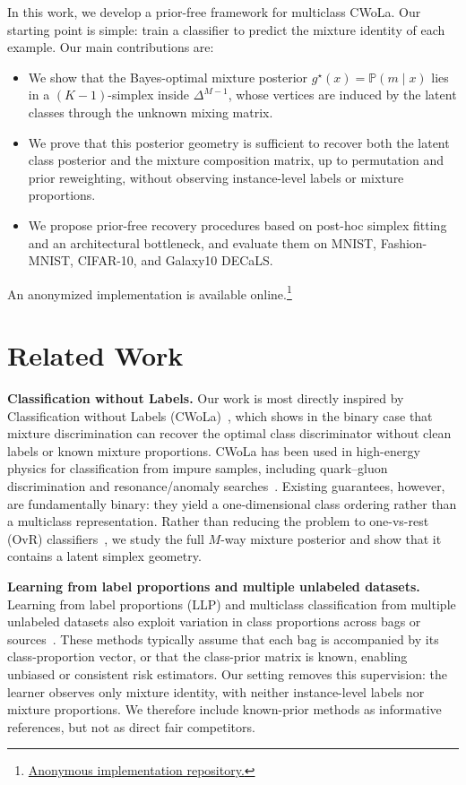 \documentclass{article}
\theoremstyle{plain}
\theoremstyle{definition}
\theoremstyle{remark}
\begin{document}
In this work, we develop a prior-free framework for multiclass CWoLa. 
Our starting point is simple: train a classifier to predict the mixture identity of each example. 
Our main contributions are:
\begin{itemize}
    \item We show that the Bayes-optimal mixture posterior \(g^\star(x)=\mathbb{P}(m\mid x)\) lies in a \((K-1)\)-simplex inside \(\Delta^{M-1}\), whose vertices are induced by the latent classes through the unknown mixing matrix.
    \item We prove that this posterior geometry is sufficient to recover both the latent class posterior and the mixture composition matrix, up to permutation and prior reweighting, without observing instance-level labels or mixture proportions.    
    \item We propose prior-free recovery procedures based on post-hoc simplex fitting and an architectural bottleneck, and evaluate them on MNIST, Fashion-MNIST, CIFAR-10, and Galaxy10 DECaLS.
\end{itemize}

An anonymized implementation is available online.\footnote{
\href{https://anonymous.4open.science/r/MulticlassClassificationWithoutLabelsViaPosteriorSimplexGeometry-B2CA}
{Anonymous implementation repository.}
}

\section{Related Work}

\textbf{Classification without Labels.}
Our work is most directly inspired by Classification without Labels (CWoLa)~\citep{Metodiev:2017vrx}, which shows in the binary case that mixture discrimination can recover the optimal class discriminator without clean labels or known mixture proportions.
CWoLa has been used in high-energy physics for classification from impure samples, including quark--gluon discrimination and resonance/anomaly searches~\citep{Komiske2018LearningTC,Collins2018CWoLaHE}.
Existing guarantees, however, are fundamentally binary: they yield a one-dimensional class ordering rather than a multiclass representation.
Rather than reducing the problem to one-vs-rest (OvR) classifiers~\citep{Rifkin2004InDO}, we study the full \(M\)-way mixture posterior and show that it contains a latent simplex geometry.

\textbf{Learning from label proportions and multiple unlabeled datasets.}
Learning from label proportions (LLP) and multiclass classification from multiple unlabeled datasets also exploit variation in class proportions across bags or sources~\citep{Scott2020LearningFL,Tang2022MulticlassCF,wei2024consistent}.
These methods typically assume that each bag is accompanied by its class-proportion vector, or that the class-prior matrix is known, enabling unbiased or consistent risk estimators.
Our setting removes this supervision: the learner observes only mixture identity, with neither instance-level labels nor mixture proportions.
We therefore include known-prior methods as informative references, but not as direct fair competitors.
\end{document}
